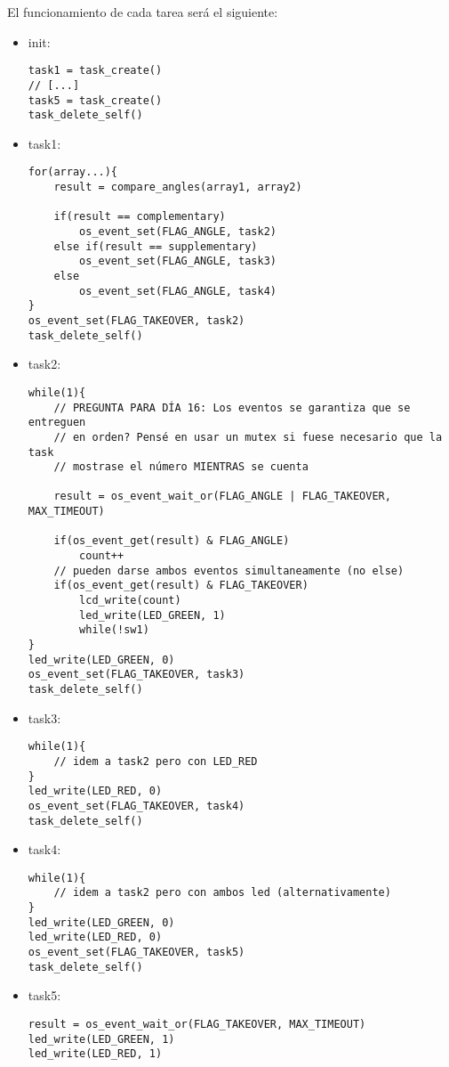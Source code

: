 \documentclass[a4paper,openright,12pt]{article}
\begin{document}
El funcionamiento de cada tarea será el siguiente:
\begin{itemize}
    \item init:
    \begin{samepage}    
    \begin{verbatim}
task1 = task_create()
// [...]
task5 = task_create()
task_delete_self()
    \end{verbatim}
    \end{samepage}
    \item task1:
    \begin{samepage}    
    \begin{verbatim}
for(array...){
    result = compare_angles(array1, array2)

    if(result == complementary)
        os_event_set(FLAG_ANGLE, task2)
    else if(result == supplementary)
        os_event_set(FLAG_ANGLE, task3)
    else
        os_event_set(FLAG_ANGLE, task4)
}
os_event_set(FLAG_TAKEOVER, task2)
task_delete_self()
    \end{verbatim}
    \end{samepage}
    \item task2:
    \begin{samepage}    
    \begin{verbatim}
while(1){
    // PREGUNTA PARA DÍA 16: Los eventos se garantiza que se entreguen
    // en orden? Pensé en usar un mutex si fuese necesario que la task
    // mostrase el número MIENTRAS se cuenta

    result = os_event_wait_or(FLAG_ANGLE | FLAG_TAKEOVER, MAX_TIMEOUT)
    
    if(os_event_get(result) & FLAG_ANGLE)
        count++
    // pueden darse ambos eventos simultaneamente (no else)
    if(os_event_get(result) & FLAG_TAKEOVER)
        lcd_write(count)
        led_write(LED_GREEN, 1)
        while(!sw1)
}
led_write(LED_GREEN, 0)
os_event_set(FLAG_TAKEOVER, task3)
task_delete_self()
    \end{verbatim}
    \end{samepage}
    \item task3:
    \begin{samepage}    
    \begin{verbatim}
while(1){
    // idem a task2 pero con LED_RED
}
led_write(LED_RED, 0)
os_event_set(FLAG_TAKEOVER, task4)
task_delete_self()
    \end{verbatim}
    \end{samepage}
    \item task4:
    \begin{samepage}    
    \begin{verbatim}
while(1){
    // idem a task2 pero con ambos led (alternativamente)
}
led_write(LED_GREEN, 0)
led_write(LED_RED, 0)
os_event_set(FLAG_TAKEOVER, task5)
task_delete_self()
    \end{verbatim}
    \end{samepage}
    \item task5:
    \begin{samepage}    
    \begin{verbatim}
result = os_event_wait_or(FLAG_TAKEOVER, MAX_TIMEOUT)
led_write(LED_GREEN, 1)
led_write(LED_RED, 1)


\end{verbatim}
\end{samepage}
\end{itemize}
\end{document}
